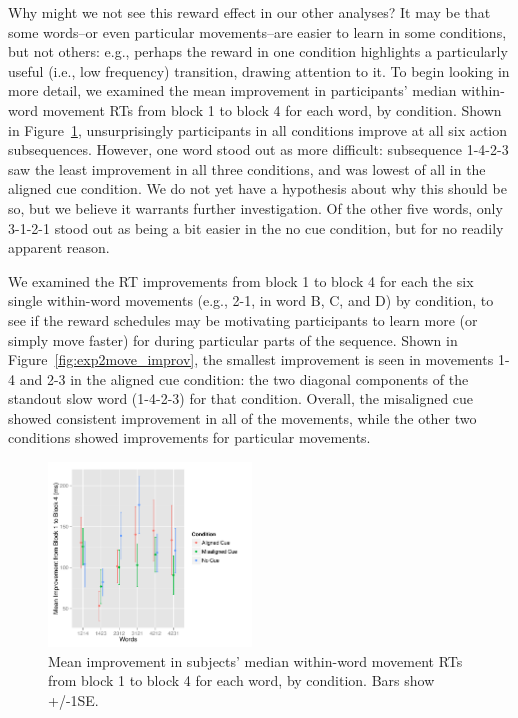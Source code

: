 \documentclass[conference]{IEEEtran}
\begin{document}
Why might we not see this reward effect in our other analyses? It may be that some words--or even particular movements--are easier to learn in some conditions, but not others: e.g., perhaps the reward in one condition highlights a particularly useful (i.e., low frequency) transition, drawing attention to it. To begin looking in more detail, we examined the mean improvement in participants' median within-word movement RTs from block 1 to block 4 for each word, by condition. Shown in Figure~\ref{fig:exp2word_improv}, unsurprisingly participants in all conditions improve at all six action subsequences. However, one word stood out as more difficult: subsequence 1-4-2-3 saw the least improvement in all three conditions, and was lowest of all in the aligned cue condition. We do not yet have a hypothesis about why this should be so, but we believe it warrants further investigation. Of the other five words, only 3-1-2-1 stood out as being a bit easier in the no cue condition, but for no readily apparent reason. 

We examined the RT improvements from block 1 to block 4 for each the six single within-word movements (e.g., 2-1, in word B, C, and D) by condition, to see if the reward schedules may be motivating participants to learn more (or simply move faster) for during particular parts of the sequence. Shown in Figure~\ref{fig:exp2move_improv}, the smallest improvement is seen in movements 1-4 and 2-3 in the aligned cue condition: the two diagonal components of the standout slow word (1-4-2-3) for that condition. Overall, the misaligned cue showed consistent improvement in all of the movements, while the other two conditions showed improvements for particular movements. 

\begin{figure}[h]
  \centering
  \includegraphics[width=0.48\textwidth]{figures/exp2_withinWordRT_improve_by_cond}
  \caption{Mean improvement in subjects' median within-word movement RTs from block 1 to block 4 for each word, by condition. Bars show +/-1SE.}
  \label{fig:exp2word_improv}
\end{figure} 
\end{document}
